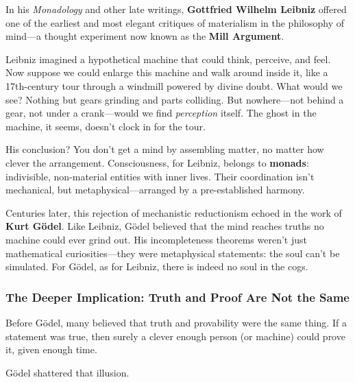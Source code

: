 \begin{tcolorbox}[title={\textbf{Historical Sidebar: No Soul in the Cogs — Leibniz’s Mill Argument}}, colback=gray!5, colframe=black, fonttitle=\bfseries]

  In his \textit{Monadology} and other late writings, \textbf{Gottfried Wilhelm Leibniz} offered one of the earliest and most elegant critiques of materialism in the philosophy of mind—a thought experiment now known as the \textbf{Mill Argument}.
  
  Leibniz imagined a hypothetical machine that could think, perceive, and feel. Now suppose we could enlarge this machine and walk around inside it, like a 17th-century tour through a windmill powered by divine doubt. What would we see? Nothing but gears grinding and parts colliding. But nowhere—not behind a gear, not under a crank—would we find \textit{perception} itself. The ghost in the machine, it seems, doesn’t clock in for the tour.
  
  His conclusion? You don’t get a mind by assembling matter, no matter how clever the arrangement. Consciousness, for Leibniz, belongs to \textbf{monads}: indivisible, non-material entities with inner lives. Their coordination isn’t mechanical, but metaphysical—arranged by a pre-established harmony.
  
  Centuries later, this rejection of mechanistic reductionism echoed in the work of \textbf{Kurt Gödel}. Like Leibniz, Gödel believed that the mind reaches truths no machine could ever grind out. His incompleteness theorems weren’t just mathematical curiosities—they were metaphysical statements: the soul can’t be simulated. For Gödel, as for Leibniz, there is indeed no soul in the cogs.
\end{tcolorbox}










\medskip

\subsubsection{The Deeper Implication: Truth and Proof Are Not the Same}

Before Gödel, many believed that truth and provability were the same thing. If a statement was true, then surely a clever enough person (or machine) could prove it, given enough time.

Gödel shattered that illusion.

